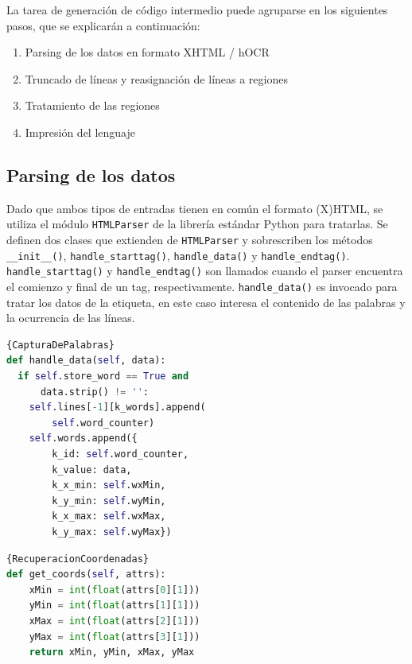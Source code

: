 La tarea de generación de código intermedio puede agruparse en los siguientes pasos, que se explicarán a continuación:

\begin{enumerate}
    \item Parsing de los datos en formato XHTML / hOCR
    \item Truncado de líneas y reasignación de líneas a regiones
    \item Tratamiento de las regiones
    \item Impresión del lenguaje
\end{enumerate}    

\subsection{Parsing de los datos}

Dado que ambos tipos de entradas tienen en común el formato (X)HTML, se utiliza el módulo \verb|HTMLParser| de la librería estándar Python para tratarlas. Se definen dos clases que extienden de \verb|HTMLParser| y sobrescriben los métodos \verb|__init__()|, \verb|handle_starttag()|, \verb|handle_data()| y \verb|handle_endtag()|. \verb|handle_starttag()| y \verb|handle_endtag()| son llamados cuando el parser encuentra el comienzo y final de un tag, respectivamente. \verb|handle_data()| es invocado para tratar los datos de la etiqueta, en este caso interesa el contenido de las palabras y la ocurrencia de las líneas.

\noindent\begin{minipage}{.45\textwidth}
    \begin{lstlisting}[language=Python,caption=Captura de las palabras,frame=tlrb,label={lst:captura-de-palabras}]{CapturaDePalabras}
def handle_data(self, data):
  if self.store_word == True and 
      data.strip() != '':
    self.lines[-1][k_words].append(
        self.word_counter)
    self.words.append({
        k_id: self.word_counter,
        k_value: data,
        k_x_min: self.wxMin,
        k_y_min: self.wyMin,
        k_x_max: self.wxMax,
        k_y_max: self.wyMax})
    \end{lstlisting}
\end{minipage}\hfill
\begin{minipage}{.45\textwidth}
    \begin{lstlisting}[language=Python,caption=Recuperación de coordenadas,frame=tlrb,label={lst:recuperacion-coordenadas}]{RecuperacionCoordenadas}
def get_coords(self, attrs):
    xMin = int(float(attrs[0][1]))
    yMin = int(float(attrs[1][1]))
    xMax = int(float(attrs[2][1]))
    yMax = int(float(attrs[3][1]))
    return xMin, yMin, xMax, yMax
    \end{lstlisting}
\end{minipage}

